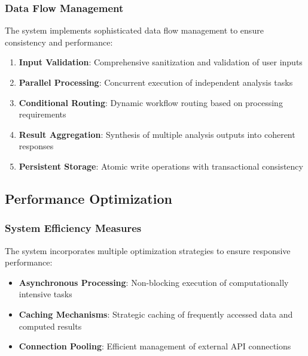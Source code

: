 \subsubsection{Data Flow Management}

The system implements sophisticated data flow management to ensure consistency and performance:

\begin{enumerate}
\item \textbf{Input Validation}: Comprehensive sanitization and validation of user inputs
\item \textbf{Parallel Processing}: Concurrent execution of independent analysis tasks
\item \textbf{Conditional Routing}: Dynamic workflow routing based on processing requirements
\item \textbf{Result Aggregation}: Synthesis of multiple analysis outputs into coherent responses
\item \textbf{Persistent Storage}: Atomic write operations with transactional consistency
\end{enumerate}


\subsection{Performance Optimization}

\subsubsection{System Efficiency Measures}

The system incorporates multiple optimization strategies to ensure responsive performance:

\begin{itemize}
\item \textbf{Asynchronous Processing}: Non-blocking execution of computationally intensive tasks
\item \textbf{Caching Mechanisms}: Strategic caching of frequently accessed data and computed results
\item \textbf{Connection Pooling}: Efficient management of external API connections
\end{itemize}


